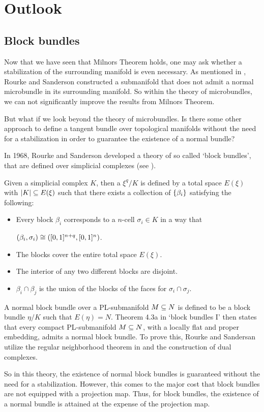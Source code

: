 \section{Outlook}\label{chapter::outlook}
\subsection*{Block bundles}
\begin{myparagraph}
    Now that we have seen that Milnors Theorem holds,
    one may ask whether a stabilization of the surrounding manifold is even necessary.
    As mentioned in ,
    Rourke and Sanderson constructed a submanifold that does not admit a normal microbundle
    in its surrounding manifold.
    So within the theory of microbundles, we can not significantly improve the results from Milnors Theorem.

    But what if we look beyond the theory of microbundles.
    Is there some other approach to define a tangent bundle over topological manifolds
    without the need for a stabilization in order to guarantee the existence of a normal bundle?

    In 1968, Rourke and Sanderson developed a theory of so called `block bundles',
    that are defined over simplicial complexes (see \cite{block}).
    
    Given a simplicial complex $K$, then a  $\xi^q/K$
    is defined by a total space $E(\xi)$ with $\vert{} K \vert{} \subseteq{} E(\xi)$ such that
    there exists a collection of  $\{\beta_i\}$ satisfying the following:
    \begin{itemize}
        \item Every block $\beta_i$ corresponds to a $n$-cell $\sigma_i \in K$ in a way that
        \begin{center}
            $(\beta_i, \sigma_i) \cong ([0, 1]^{n + q}, [0, 1]^n)$.
        \end{center}
        \item The blocks cover the entire total space $E(\xi)$.
        \item The interior of any two different blocks are disjoint.
        \item $\beta_i \cap \beta_j$ is the union of the blocks of the faces for $\sigma_i \cap \sigma_j$.
    \end{itemize}

    A normal block bundle over a PL-submanifold $M \subseteq{} N$ is defined to be a block bundle $\eta/K$ such that $E(\eta) = N$.
    Theorem 4.3a in `block bundles I' \cite{block} then states that every compact PL-submanifold $M \subseteq{} N$, with a locally flat and proper embedding, admits a normal block bundle.
    To prove this, Rourke and Sandersan utilize the regular neighborhood theorem in \cite[p.293]{regular} and the construction of dual complexes.

    So in this theory, the existence of normal block bundles is guaranteed without the need for a stabilization.
    However, this comes to the major cost that block bundles are not equipped with a projection map.
    Thus, for block bundles, the existence of a normal bundle is attained at the expense of the projection map.
\end{myparagraph}
